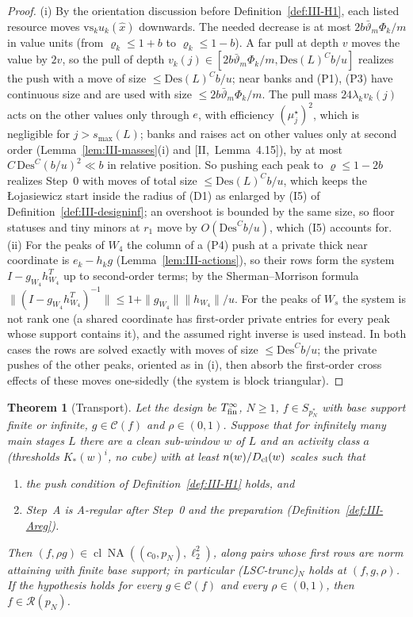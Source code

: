 \documentclass[10pt]{amsart}
\newtheorem{theorem}{Theorem}[section]
\theoremstyle{definition}
\theoremstyle{remark}
\newcommand{\NA}{\operatorname{NA}}
\newcommand{\Cset}{\mathcal C}
\newcommand{\cl}{\operatorname{cl}}
\newcommand{\Rec}{\mathcal R}
\begin{document}
\begin{proof}
(i) By the orientation discussion before Definition~\ref{def:III-H1}, each
listed resource moves $\mathrm{vs}_ku_k(\hat x)$ downwards.  The needed
decrease is at most $2b\bar\vartheta_m\Phi_k/m$ in value units (from
$\varrho_k\le1+b$ to $\varrho_k\le1-b$).  A far pull at depth $v$ moves the
value by $2v$, so the pull of depth $v_k(j)\in[2b\bar\vartheta_m\Phi_k/m,
\mathrm{Des}(L)^Cb/u]$ realizes the push with a move of size $\le\mathrm{Des}
(L)^Cb/u$; near banks and (P1), (P3) have continuous size and are used with
size $\le2b\bar\vartheta_m\Phi_k/m$.  The pull mass $24\lambda_kv_k(j)$ acts on
the other values only through $e$, with efficiency $(\mu^\star_j)^2$, which
is negligible for $j>s_{\max}(L)$; banks and raises act on other values only
at second order (Lemma~\ref{lem:III-masses}(i) and [II,~Lemma~4.15]), by at
most $C\,\mathrm{Des}^C(b/u)^2\ll b$ in relative position.  So pushing each
peak to $\varrho\le1-2b$ realizes Step~0 with moves of total size
$\le\mathrm{Des}(L)^Cb/u$, which keeps the {\L}ojasiewicz start inside the
radius of (D1) as enlarged by (I5) of Definition~\ref{def:III-designinf}; an
overshoot is bounded by the same size, so floor statuses and tiny minors at
$r_1$ move by $O(\mathrm{Des}^Cb/u)$, which (I5) accounts for.  (ii) For the
peaks of $W_4$ the column of a (P4) push at a private thick near coordinate
is $e_k-h_kg$ (Lemma~\ref{lem:III-actions}), so their rows form the system
$I-g_{W_4}h_{W_4}^T$ up to second-order terms; by the Sherman--Morrison
formula $\|(I-g_{W_4}h_{W_4}^T)^{-1}\|\le1+\|g_{W_4}\|\|h_{W_4}\|/u$.  For the
peaks of $W_s$ the system is not rank one (a shared coordinate has
first-order private entries for every peak whose support contains it), and
the assumed right inverse is used instead.  In both cases the rows are
solved exactly with moves of size $\le\mathrm{Des}^Cb/u$; the private pushes of
the other peaks, oriented as in (i), then absorb the first-order cross
effects of these moves one-sidedly (the system is block triangular).
\end{proof}

\begin{theorem}[Transport]\label{thm:III-transport}
Let the design be $T^\infty_{\rm fin}$, $N\ge1$, $f\in S_{p_N^*}$ with base
support finite or infinite, $g\in\Cset(f)$ and $\rho\in(0,1)$.  Suppose that
for infinitely many main stages $L$ there are a clean sub-window $w$ of $L$ and
an activity class $a$ \textup{(}thresholds $K_*(w)^i$, no cube\textup{)} with at
least $n(w)/D_{\rm cl}(w)$ scales such that
\begin{enumerate}
\item[(H1$^*$)] the push condition of Definition~\textup{\ref{def:III-H1}} holds,
and
\item[(H2)] Step~A is A-regular after Step~0 and the preparation
\textup{(}Definition~\textup{\ref{def:III-Areg})}.
\end{enumerate}
Then $(f,\rho g)\in\cl\NA((c_0,p_N),\ell_2^2)$, along pairs whose first rows are
norm attaining with finite base support; in particular
\textup{(LSC-trunc)}$_N$ holds at $(f,g,\rho)$.  If the hypothesis holds for every
$g\in\Cset(f)$ and every $\rho\in(0,1)$, then $f\in\Rec(p_N)$.
\end{theorem}
\end{document}
